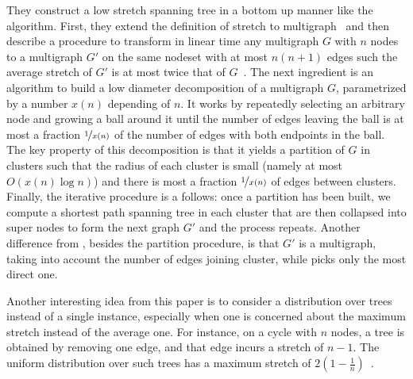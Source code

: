 They construct a low stretch spanning tree in a bottom up manner like the \gtx{} algorithm. First,
they extend the definition of stretch to multigraph~\autocite[Section 4]{LowerBound95} and then
describe a procedure to transform in linear time any multigraph $G$ with $n$ nodes to a multigraph
$G'$ on the same nodeset with at most $n(n+1)$ edges such the average stretch of $G'$ is at most
twice that of $G$~\autocite[Lemma 5.2]{LowerBound95}. The next ingredient is an algorithm to build a
low diameter decomposition of a multigraph $G$, parametrized by a number $x(n)$ depending of $n$. It
works by repeatedly selecting an arbitrary node and growing a ball around it until the number of
edges leaving the ball is at most a fraction $\nicefrac{1}{x(n)}$ of the number of edges with both
endpoints in the ball. The key property of this decomposition is that it yields a partition of $G$
in clusters such that the radius of each cluster is small (namely at most $O(x(n)\log n)$) and there
is most a fraction $\nicefrac{1}{x(n)}$ of edges between clusters. Finally, the iterative procedure
is a follows: once a partition has been built, we compute a shortest path spanning tree in each
cluster that are then collapsed into super nodes to form the next graph $G'$ and the process repeats.
Another difference from \gtx{}, besides the partition procedure, is that $G'$ is a multigraph,
taking into account the number of edges joining cluster, while \collapseStar{} picks only the most
direct one.

Another interesting idea from this paper is to consider a distribution over trees instead of a
single instance, especially when one is concerned about the maximum stretch instead of the average
one. For instance, on a cycle with $n$ nodes, a tree is obtained by removing one edge, and that edge
incurs a stretch of $n-1$. The uniform distribution over such trees has a maximum stretch of
$2\left(1 - \frac{1}{n}\right)$~\autocite{circle2k89}.

